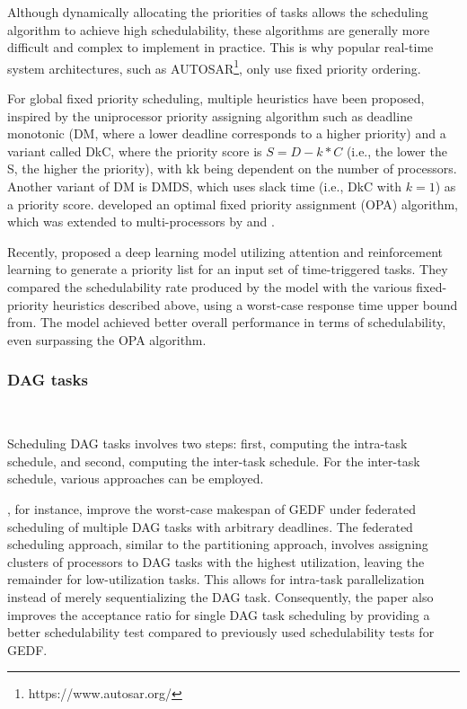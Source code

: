 Although dynamically allocating the priorities of tasks 
allows the scheduling algorithm to achieve high schedulability, 
these algorithms are generally more difficult and complex to 
implement in practice. This is why popular real-time system 
architectures, such as AUTOSAR\footnote{https://www.autosar.org/}, 
only use fixed priority ordering\cite{panic2014autosar_static}.

For global fixed priority scheduling, multiple heuristics have 
been proposed, inspired by the uniprocessor priority assigning 
algorithm such as deadline monotonic (DM, where a lower deadline 
corresponds to a higher priority) and a variant called DkC, 
where the priority score is $S=D-k*C$ (i.e., the lower the S, 
the higher the priority), with kk being dependent on the number of 
processors\cite{andersson2000DMDkC}. Another variant of DM is 
DMDS\cite{andersson2008DMDS}, which uses slack time (i.e., DkC 
with $k=1$) as a priority score. \cite{audsley2001OPA} developed 
an optimal fixed priority assignment (OPA) algorithm, 
which was extended to multi-processors by \cite{davis2011improvedTDA} 
and \cite{bertogna2008RTA_test}.

Recently, \cite{lee2020panda} proposed a deep learning model 
utilizing attention and reinforcement learning to generate a 
priority list for an input set of time-triggered tasks. They 
compared the schedulability rate produced by the model with the 
various fixed-priority heuristics described above, using a 
worst-case response time upper bound from\cite{bertogna2008RTA_test}. 
The model achieved better overall performance in terms of 
schedulability, even surpassing the OPA algorithm.

\subsubsection{DAG tasks}
~

Scheduling DAG tasks involves two steps: first, 
computing the intra-task schedule, and second, computing 
the inter-task schedule. For the inter-task schedule, various 
approaches can be employed.

\cite{WangGEDFDag2019}, for instance, improve the worst-case 
makespan of GEDF under federated scheduling of multiple DAG tasks 
with arbitrary deadlines. The federated scheduling approach, 
similar to the partitioning approach, involves assigning clusters 
of processors to DAG tasks with the highest utilization, leaving 
the remainder for low-utilization tasks. This allows for 
intra-task parallelization instead of merely sequentializing 
the DAG task. Consequently, the paper also improves the acceptance 
ratio for single DAG task scheduling by providing a better 
schedulability test compared to previously used 
schedulability tests for GEDF.

